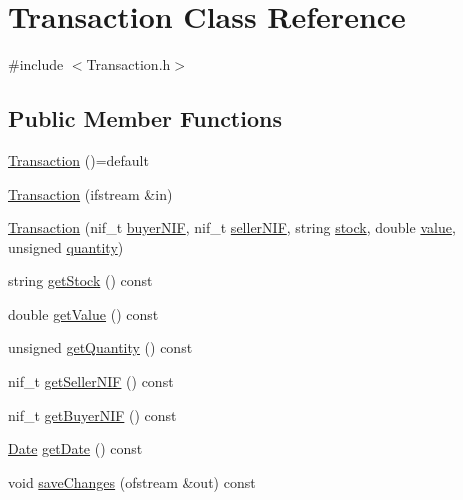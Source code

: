 \hypertarget{class_transaction}{}\section{Transaction Class Reference}
\label{class_transaction}


{\ttfamily \#include $<$Transaction.\+h$>$}

\subsection*{Public Member Functions}
\begin{DoxyCompactItemize}
\item 
\hyperlink{class_transaction_a0c8031bed6e7a45eda7bc2ca8f40e851}{Transaction} ()=default
\item 
\hyperlink{class_transaction_a2bbb78694a94a630cb1e9e741dc120a7}{Transaction} (ifstream \&in)
\item 
\hyperlink{class_transaction_abd1826b5a0499ddac290a4f1297e7455}{Transaction} (nif\+\_\+t \hyperlink{class_transaction_a3db24320f561ae3a72887e7a34b19917}{buyer\+N\+IF}, nif\+\_\+t \hyperlink{class_transaction_a4f779b188a508987aa610e4274765059}{seller\+N\+IF}, string \hyperlink{class_transaction_ae0fd78bf4db4a8dc6d4d931f107a6213}{stock}, double \hyperlink{class_transaction_a75d644553218251b030313776ff33f51}{value}, unsigned \hyperlink{class_transaction_a32045bcdce9ba390cf1c646578e29fd3}{quantity})
\item 
string \hyperlink{class_transaction_af6582ddc59e9cfa99a7ef178216799be}{get\+Stock} () const
\item 
double \hyperlink{class_transaction_a95976b2e60b66d766edf4db534324db4}{get\+Value} () const
\item 
unsigned \hyperlink{class_transaction_ab3bfaa0469e1f45c5bd5dc164ac3c850}{get\+Quantity} () const
\item 
nif\+\_\+t \hyperlink{class_transaction_a3c3a57a3240bece392c56ff41bc3c21b}{get\+Seller\+N\+IF} () const
\item 
nif\+\_\+t \hyperlink{class_transaction_afa91c88bb936d8bd8480ac36b599649b}{get\+Buyer\+N\+IF} () const
\item 
\hyperlink{class_date}{Date} \hyperlink{class_transaction_af2ef4a1ef82f9ff5d34dae7234211589}{get\+Date} () const
\item 
void \hyperlink{class_transaction_a3c0c3c4a64c5b3d20c420708357a86be}{save\+Changes} (ofstream \&out) const
\end{DoxyCompactItemize}
